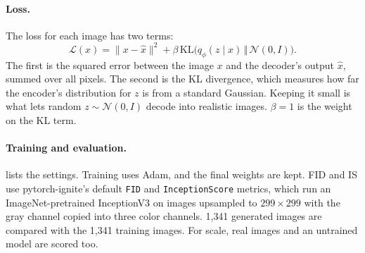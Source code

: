 \documentclass{article}
\begin{document}
\paragraph{Loss.} The loss for each image has two terms:
\begin{equation}
\mathcal{L}(x)=\lVert x-\hat{x}\rVert^2+\beta\,\mathrm{KL}\big(q_\phi(z\mid x)\,\Vert\,\mathcal{N}(0,I)\big).
\end{equation}
The first is the squared error between the image $x$ and the decoder's output $\hat{x}$, summed over all pixels. The second is the KL divergence, which measures how far the encoder's distribution for $z$ is from a standard Gaussian. Keeping it small is what lets random $z\sim\mathcal{N}(0,I)$ decode into realistic images. $\beta=1$ is the weight on the KL term.

\paragraph{Training and evaluation.}  lists the settings. Training uses Adam, and the final weights are kept. FID and IS use pytorch-ignite's default \texttt{FID} and \texttt{InceptionScore} metrics, which run an ImageNet-pretrained InceptionV3 on images upsampled to $299\times299$ with the gray channel copied into three color channels. 1{,}341 generated images are compared with the 1{,}341 training images. For scale, real images and an untrained model are scored too.
\end{document}
